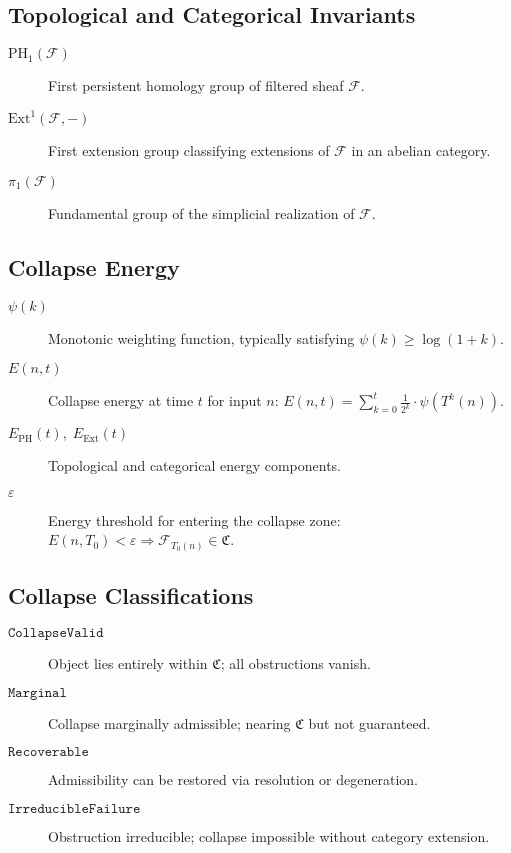 \documentclass[11pt]{article}
\begin{document}
\subsection*{Topological and Categorical Invariants}

\begin{description}
  \item[\( \mathrm{PH}_1(\mathcal{F}) \)] First persistent homology group of filtered sheaf \( \mathcal{F} \).
  \item[\( \mathrm{Ext}^1(\mathcal{F}, -) \)] First extension group classifying extensions of \( \mathcal{F} \) in an abelian category.
  \item[\( \pi_1(\mathcal{F}) \)] Fundamental group of the simplicial realization of \( \mathcal{F} \).
\end{description}

\subsection*{Collapse Energy}

\begin{description}
  \item[\( \psi(k) \)] Monotonic weighting function, typically satisfying \( \psi(k) \geq \log(1 + k) \).
  \item[\( E(n, t) \)] Collapse energy at time \( t \) for input \( n \):  
  \( E(n,t) = \sum_{k=0}^{t} \frac{1}{2^k} \cdot \psi(T^k(n)) \).
  \item[\( E_{\mathrm{PH}}(t),\; E_{\mathrm{Ext}}(t) \)] Topological and categorical energy components.
  \item[\( \varepsilon \)] Energy threshold for entering the collapse zone: \( E(n,T_0) < \varepsilon \Rightarrow \mathcal{F}_{T_0(n)} \in \mathfrak{C} \).
\end{description}

\subsection*{Collapse Classifications}

\begin{description}
  \item[\( \texttt{CollapseValid} \)] Object lies entirely within \( \mathfrak{C} \); all obstructions vanish.
  \item[\( \texttt{Marginal} \)] Collapse marginally admissible; nearing \( \mathfrak{C} \) but not guaranteed.
  \item[\( \texttt{Recoverable} \)] Admissibility can be restored via resolution or degeneration.
  \item[\( \texttt{IrreducibleFailure} \)] Obstruction irreducible; collapse impossible without category extension.
\end{description}
\end{document}
